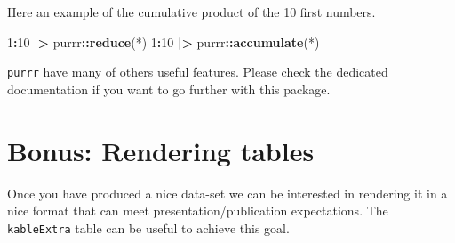 \documentclass[
]{book}
\newenvironment{Shaded}{\begin{snugshade}}{\end{snugshade}}
\newcommand{\AttributeTok}[1]{\textcolor[rgb]{0.13,0.29,0.53}{#1}}
\newcommand{\DecValTok}[1]{\textcolor[rgb]{0.00,0.00,0.81}{#1}}
\newcommand{\FunctionTok}[1]{\textcolor[rgb]{0.13,0.29,0.53}{\textbf{#1}}}
\newcommand{\NormalTok}[1]{#1}
\newcommand{\SpecialCharTok}[1]{\textcolor[rgb]{0.81,0.36,0.00}{\textbf{#1}}}
\newcommand{\StringTok}[1]{\textcolor[rgb]{0.31,0.60,0.02}{#1}}
\begin{document}
Here an example of the cumulative product of the 10 first numbers.

\begin{Shaded}
\begin{Highlighting}[]
\DecValTok{1}\SpecialCharTok{:}\DecValTok{10} \SpecialCharTok{|\textgreater{}}\NormalTok{ purrr}\SpecialCharTok{::}\FunctionTok{reduce}\NormalTok{(}\StringTok{\textasciigrave{}}\AttributeTok{*}\StringTok{\textasciigrave{}}\NormalTok{)}
\DecValTok{1}\SpecialCharTok{:}\DecValTok{10} \SpecialCharTok{|\textgreater{}}\NormalTok{ purrr}\SpecialCharTok{::}\FunctionTok{accumulate}\NormalTok{(}\StringTok{\textasciigrave{}}\AttributeTok{*}\StringTok{\textasciigrave{}}\NormalTok{)}
\end{Highlighting}
\end{Shaded}

\texttt{purrr} have many of others useful features. Please check the dedicated documentation if you want to go further with this package.

\section{Bonus: Rendering tables}\label{bonus-rendering-tables}

Once you have produced a nice data-set we can be interested in rendering it in a nice format that can meet presentation/publication expectations. The \texttt{kableExtra} table can be useful to achieve this goal.
\end{document}
